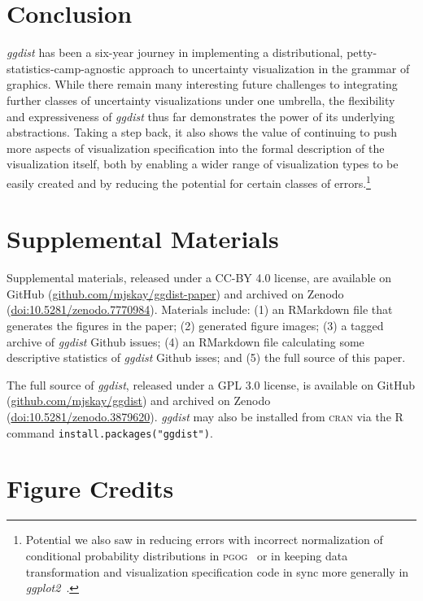 \documentclass[journal]{vgtc}              %
\begin{document}
\section{Conclusion}

\textit{ggdist} has been a six-year journey in implementing a distributional, petty-statistics-camp-agnostic approach to uncertainty visualization in the grammar of graphics. While there remain many interesting future challenges to integrating further classes of uncertainty visualizations under one umbrella, the flexibility and expressiveness of \textit{ggdist} thus far demonstrates the power of its underlying abstractions. Taking a step back, it also shows the value of continuing to push more aspects of visualization specification into the formal description of the visualization itself, both by enabling a wider range of visualization types to be easily created and by reducing the potential for certain classes of errors.\footnote{Potential we also saw in reducing errors with incorrect normalization of conditional probability distributions in \textsc{pgog}~\cite{pu2020probabilistic} or in keeping data transformation and visualization specification code in sync more generally in \textit{ggplot2}~\cite{pu2023inpractice}.} 

\section*{Supplemental Materials}
\label{sec:supplemental_materials}

Supplemental materials, released under a CC-BY 4.0 license, are available on GitHub (\href{https://github.com/mjskay/ggdist-paper}{github.com/mjskay/ggdist-paper}) and archived on Zenodo (\href{https://doi.org/10.5281/zenodo.7770984}{doi:10.5281/zenodo.7770984}).
Materials include: (1) an RMarkdown file that generates the figures in the paper; (2) generated figure images; (3) a tagged archive of \textit{ggdist} Github issues; (4) an RMarkdown file calculating some descriptive statistics of \textit{ggdist} Github isses; and (5) the full source of this paper.

The full source of \textit{ggdist}, released under a GPL 3.0 license, is available on GitHub (\href{https://github.com/mjskay/ggdist}{github.com/mjskay/ggdist}) and archived on Zenodo (\href{https://doi.org/10.5281/zenodo.3879620}{doi:10.5281/zenodo.3879620}). \textit{ggdist} may also be installed from \textsc{cran} via the R command \texttt{install.packages("ggdist")}.

\section*{Figure Credits}
\label{sec:figure_credits}
\end{document}
